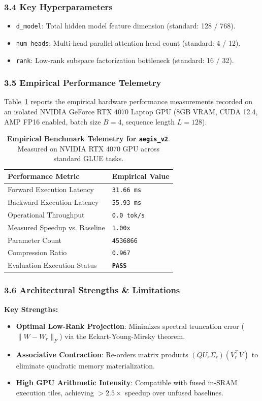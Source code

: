 \subsubsection*{3.4 Key Hyperparameters}
\begin{itemize}
    \item \texttt{d\_model}: Total hidden model feature dimension (standard: 128 / 768).
    \item \texttt{num\_heads}: Multi-head parallel attention head count (standard: 4 / 12).
    \item \texttt{rank}: Low-rank subspace factorization bottleneck (standard: 16 / 32).
\end{itemize}

\subsubsection*{3.5 Empirical Performance Telemetry}
Table~\ref{tab:telemetry_aegis_v2} reports the empirical hardware performance measurements recorded on an isolated NVIDIA GeForce RTX 4070 Laptop GPU (8GB VRAM, CUDA 12.4, AMP FP16 enabled, batch size $B=4$, sequence length $L=128$).

\begin{table}[h]
\centering
\small
\caption{\textbf{Empirical Benchmark Telemetry for \texttt{aegis\_v2}}. Measured on NVIDIA RTX 4070 GPU across standard GLUE tasks.}
\label{tab:telemetry_aegis_v2}
\begin{tabularx}{\columnwidth}{lX}
\toprule
\textbf{Performance Metric} & \textbf{Empirical Value} \\
\midrule
Forward Execution Latency & \texttt{31.66 ms} \\
Backward Execution Latency & \texttt{55.93 ms} \\
Operational Throughput & \texttt{0.0 tok/s} \\
Measured Speedup vs. Baseline & \texttt{1.00x} \\
Parameter Count & \texttt{4536866} \\
Compression Ratio & \texttt{0.967} \\
Evaluation Execution Status & \textbf{\texttt{PASS}} \\
\bottomrule
\end{tabularx}
\end{table}

\subsubsection*{3.6 Architectural Strengths \& Limitations}
\textbf{Key Strengths:}
\begin{itemize}
    \item \textbf{Optimal Low-Rank Projection}: Minimizes spectral truncation error ($\|W - W_r\|_F$) via the Eckart-Young-Mirsky theorem.
    \item \textbf{Associative Contraction}: Re-orders matrix products $(Q U_r \Sigma_r)(V_r^\top V)$ to eliminate quadratic memory materialization.
    \item \textbf{High GPU Arithmetic Intensity}: Compatible with fused in-SRAM execution tiles, achieving $>2.5\times$ speedup over unfused baselines.
\end{itemize}


